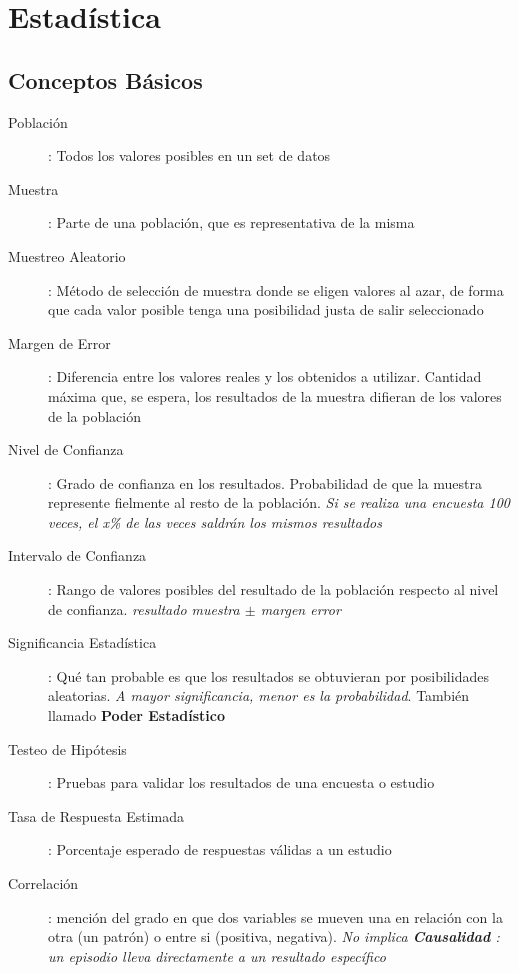 
\section{Estadística}
\subsection{Conceptos Básicos}
\begin{description}
    \item [Población]{ : Todos los valores posibles en un set de datos}
    \item [Muestra]{ : Parte de una población, que es representativa de la misma}
    \item [Muestreo Aleatorio]{ : Método de selección de muestra donde se eligen valores al azar, de forma que cada valor posible tenga una posibilidad justa de salir seleccionado}
    \item [Margen de Error]{ : Diferencia entre los valores reales y los obtenidos a utilizar. Cantidad máxima que, se espera, los resultados de la muestra difieran de los valores de la población}
    \item [Nivel de Confianza]{ : Grado de confianza en los resultados. Probabilidad de que la muestra represente fielmente al resto de la población. \textit{Si se realiza una encuesta 100 veces, el x\% de las veces saldrán los mismos resultados}}
    \item [Intervalo de Confianza]{ : Rango de valores posibles del resultado de la población respecto al nivel de confianza. \textit{resultado muestra ${\pm}$ margen error}}
    \item [Significancia Estadística]{ : Qué tan probable es que los resultados se obtuvieran por posibilidades aleatorias. \textit{A mayor significancia, menor es la probabilidad}. También llamado \textbf{Poder Estadístico}} 
    \item [Testeo de Hipótesis]{ : Pruebas para validar los resultados de una encuesta o estudio}
    \item [Tasa de Respuesta Estimada]{ : Porcentaje esperado de respuestas válidas a un estudio}
    \item [Correlación]{ : mención del grado en que dos variables se mueven una en relación con la otra (un patrón) o entre si (positiva, negativa). \textit{No implica \textbf{Causalidad} : un episodio lleva directamente a un resultado específico}}
\end{description}

